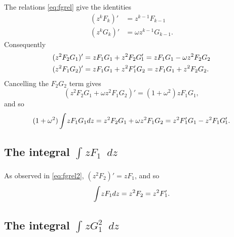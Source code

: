 \documentclass[parskip=half]{scrartcl}
\newcommand{\Int}[2]{\int_{#1}^{#2}\!}
\newcommand{\D}{\mathop{}\!d}
\theoremstyle{nonumberplain}
\begin{document}
The relations \eqref{eq:fgrel} give the identities
\begin{equation}
    \begin{aligned}
        \label{eq:fgrel2}
        (z^kF_k)' &= z^{k-1}F_{k-1}\\
        (z^kG_k)' &= \omega z^{k-1}G_{k-1}.
    \end{aligned}
\end{equation}
Consequently
\begin{equation}
    \begin{aligned}
        (z^2 F_2 G_1)' &= z F_1 G_1 + z^2 F_2 \Gp_1 = z F_1 G_1 - \omega z^2 F_2 G_2 \\
        (z^2 F_1 G_2)' &= z F_1 G_1 + z^2 \Fp_1 G_2 = z F_1 G_1 + z^2 F_2 G_2.
    \end{aligned}
\end{equation}
Cancelling the $F_2G_2$ term gives
\begin{equation}
    (z^2 F_2 G_1 + \omega z^2 F_1 G_2)' =
    (1+\omega^2) z F_1 G_1,
\end{equation}
and so
\begin{equation}
    (1+\omega^2) \Int{}{} z F_1 G_1 dz = z^2 F_2 G_1 + \omega z^2 F_1 G_2 = z^2 \Fp_1 G_1 - z^2 F_1 \Gp_1.
\end{equation}

\subsection*{The integral $\Int{}{} z F_1 \D z$}

As observed in \eqref{eq:fgrel2}, $(z^2 F_2)' = z F_1$, and so
\begin{equation}
    \Int{}{} z F_1 dz = z^2 F_2 = z^2 \Fp_1.
\end{equation}

\subsection*{The integral $\Int{}{} z G_1^2 \D z$}
\end{document}
